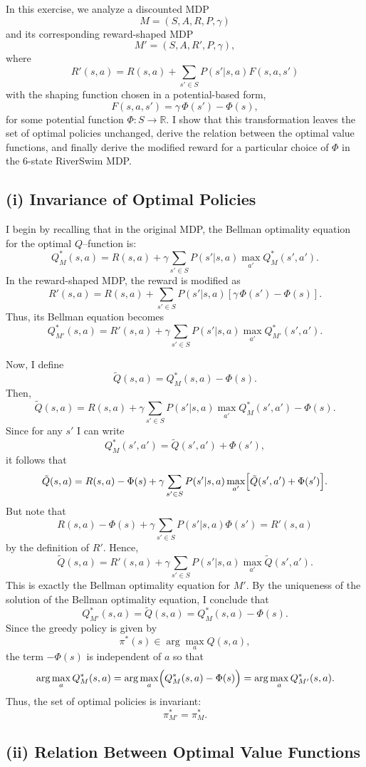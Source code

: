In this exercise, we analyze a discounted MDP 
\[
M=(S,A,R,P,\gamma)
\]
and its corresponding reward-shaped MDP 
\[
M'=(S,A,R',P,\gamma),
\]
where 
\[
R'(s,a)=R(s,a)+\sum_{s'\in S}P(s'|s,a)F(s,a,s')
\]
with the shaping function chosen in a potential-based form,
\[
F(s,a,s')=\gamma\,\Phi(s')-\Phi(s),
\]
for some potential function \(\Phi:S\to \mathbb{R}\). I show that this transformation leaves the set of optimal policies unchanged, derive the relation between the optimal value functions, and finally derive the modified reward for a particular choice of \(\Phi\) in the 6-state RiverSwim MDP.

\subsection*{(i) Invariance of Optimal Policies}

I begin by recalling that in the original MDP, the Bellman optimality equation for the optimal $Q$--function is:
\[
Q^*_M(s,a)=R(s,a)+\gamma\sum_{s'\in S}P(s'|s,a)\max_{a'}Q^*_M(s',a').
\]
In the reward-shaped MDP, the reward is modified as
\[
R'(s,a)=R(s,a)+\sum_{s'\in S}P(s'|s,a)[\gamma\,\Phi(s')-\Phi(s)].
\]
Thus, its Bellman equation becomes
\[
Q^*_{M'}(s,a)=R'(s,a)+\gamma\sum_{s'\in S}P(s'|s,a)\max_{a'}Q^*_{M'}(s',a').
\]

Now, I define
\[
\tilde{Q}(s,a)=Q^*_M(s,a)-\Phi(s).
\]
Then,
\[
\tilde{Q}(s,a)=R(s,a)+\gamma\sum_{s'\in S}P(s'|s,a)\max_{a'}Q^*_M(s',a')-\Phi(s).
\]
Since for any \(s'\) I can write 
\[
Q^*_M(s',a')=\tilde{Q}(s',a')+\Phi(s'),
\]
it follows that
\[
\tilde{Q}(s,a)=R(s,a)-\Phi(s)+\gamma\sum_{s'\in S}P(s'|s,a)\max_{a'}\Bigl[\tilde{Q}(s',a')+\Phi(s')\Bigr].
\]
But note that
\[
R(s,a)-\Phi(s)+\gamma\sum_{s'\in S}P(s'|s,a)\Phi(s') = R'(s,a)
\]
by the definition of \(R'\). Hence,
\[
\tilde{Q}(s,a)=R'(s,a)+\gamma\sum_{s'\in S}P(s'|s,a)\max_{a'}\tilde{Q}(s',a').
\]
This is exactly the Bellman optimality equation for \(M'\). By the uniqueness of the solution of the Bellman optimality equation, I conclude that
\[
Q^*_{M'}(s,a)=\tilde{Q}(s,a)= Q^*_M(s,a)-\Phi(s).
\]
Since the greedy policy is given by 
\[
\pi^*(s) \in \arg\max_{a} Q(s,a),
\]
the term \(-\Phi(s)\) is independent of \(a\) so that
\[
\arg\max_{a}Q^*_M(s,a)=\arg\max_{a}\Bigl(Q^*_M(s,a)-\Phi(s)\Bigr)=\arg\max_{a} Q^*_{M'}(s,a).
\]
Thus, the set of optimal policies is invariant:
\[
\pi^*_{M'}=\pi^*_M.
\]

\subsection*{(ii) Relation Between Optimal Value Functions}

